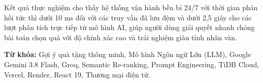Kết quả thực nghiệm cho thấy hệ thống vận hành bền bỉ 24/7 với thời gian phản hồi tức thì dưới 10 ms đối với các truy vấn đã lưu đệm và dưới 2,5 giây cho các lượt phân tích trực tiếp từ mô hình AI, giúp người dùng giải quyết nhanh chóng bài toán chọn quà với độ chính xác cao và trải nghiệm giàu tính nhân văn.

\vspace{0.5cm}
\noindent\textbf{Từ khóa:} Gợi ý quà tặng thông minh, Mô hình Ngôn ngữ Lớn (LLM), Google Gemini 3.8 Flash, Groq, Semantic Re-ranking, Prompt Engineering, TiDB Cloud, Vercel, Render, React 19, Thương mại điện tử.